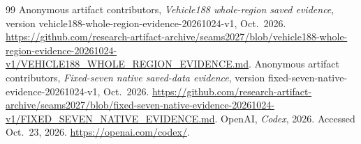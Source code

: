 \documentclass[11pt]{article}
\begin{document}
\begin{thebibliography}{99}
Anonymous artifact contributors, \emph{Vehicle188 whole-region saved evidence}, version vehicle188-whole-region-evidence-20261024-v1, Oct.~2026. \url{https://github.com/research-artifact-archive/seams2027/blob/vehicle188-whole-region-evidence-20261024-v1/VEHICLE188_WHOLE_REGION_EVIDENCE.md}.
Anonymous artifact contributors, \emph{Fixed-seven native saved-data evidence}, version fixed-seven-native-evidence-20261024-v1, Oct.~2026. \url{https://github.com/research-artifact-archive/seams2027/blob/fixed-seven-native-evidence-20261024-v1/FIXED_SEVEN_NATIVE_EVIDENCE.md}.
OpenAI, \emph{Codex}, 2026. Accessed Oct.~23, 2026. \url{https://openai.com/codex/}.
\end{thebibliography}
\end{document}
